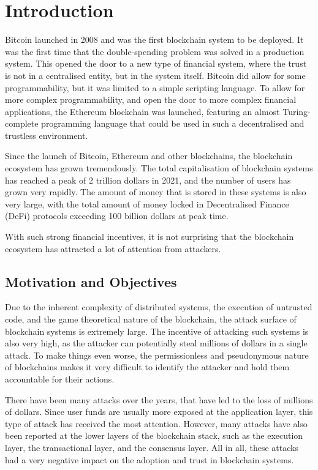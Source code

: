 \chapter{Introduction}
\label{ch:introduction}
Bitcoin launched in 2008 and was the first blockchain system to be deployed.
It was the first time that the double-spending problem was solved in a production system.
This opened the door to a new type of financial system, where the trust is not in a centralised entity, but in the system itself.
Bitcoin did allow for some programmability, but it was limited to a simple scripting language.
To allow for more complex programmability, and open the door to more complex financial applications, the Ethereum blockchain was launched, featuring an almost Turing-complete programming language that could be used in such a decentralised and trustless environment.

Since the launch of Bitcoin, Ethereum and other blockchains, the blockchain ecosystem has grown tremendously.
The total capitalisation of blockchain systems has reached a peak of 2 trillion dollars in 2021, and the number of users has grown very rapidly.
The amount of money that is stored in these systems is also very large, with the total amount of money locked in Decentralised Finance (DeFi) protocols exceeding 100 billion dollars at peak time.

With such strong financial incentives, it is not surprising that the blockchain ecosystem has attracted a lot of attention from attackers.

\section{Motivation and Objectives}

Due to the inherent complexity of distributed systems, the execution of untrusted code, and the game theoretical nature of the blockchain, the attack surface of blockchain systems is extremely large.
The incentive of attacking such systems is also very high, as the attacker can potentially steal millions of dollars in a single attack.
To make things even worse, the permissionless and pseudonymous nature of blockchains makes it very difficult to identify the attacker and hold them accountable for their actions.

There have been many attacks over the years, that have led to the loss of millions of dollars.
Since user funds are usually more exposed at the application layer, this type of attack has received the most attention.
However, many attacks have also been reported at the lower layers of the blockchain stack, such as the execution layer, the transactional layer, and the consensus layer.
All in all, these attacks had a very negative impact on the adoption and trust in blockchain systems.

